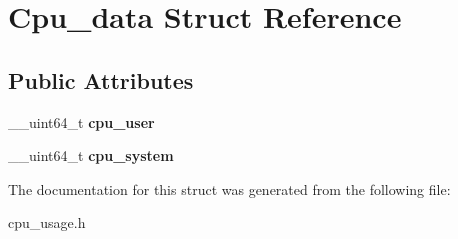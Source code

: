 \hypertarget{structCpu__data}{}\section{Cpu\+\_\+data Struct Reference}
\label{structCpu__data}
\subsection*{Public Attributes}
\begin{DoxyCompactItemize}
\item 
\+\_\+\+\_\+uint64\+\_\+t {\bfseries cpu\+\_\+user}\hypertarget{structCpu__data_aac8813424ab186472980db6de74ab039}{}\label{structCpu__data_aac8813424ab186472980db6de74ab039}

\item 
\+\_\+\+\_\+uint64\+\_\+t {\bfseries cpu\+\_\+system}\hypertarget{structCpu__data_a2cec917785b45339be0ef27f3d2ddc79}{}\label{structCpu__data_a2cec917785b45339be0ef27f3d2ddc79}

\end{DoxyCompactItemize}


The documentation for this struct was generated from the following file\+:\begin{DoxyCompactItemize}
\item 
cpu\+\_\+usage.\+h\end{DoxyCompactItemize}
